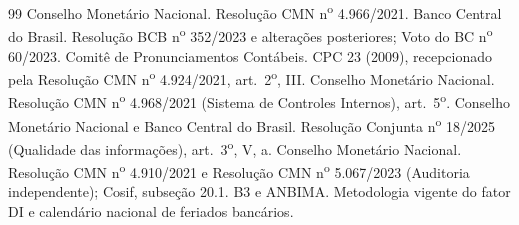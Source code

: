 \documentclass[11pt, a4paper]{article}
\theoremstyle{definition}
\theoremstyle{plain}
\theoremstyle{remark}
\begin{document}
\begin{thebibliography}{99}
 Conselho Monetário Nacional. Resolução CMN n\textsuperscript{o} 4.966/2021. Banco Central do Brasil. Resolução BCB n\textsuperscript{o} 352/2023 e alterações posteriores; Voto do BC n\textsuperscript{o} 60/2023.
 Comitê de Pronunciamentos Contábeis. CPC 23 (2009), recepcionado pela Resolução CMN n\textsuperscript{o} 4.924/2021, art.\ 2\textsuperscript{o}, III.
 Conselho Monetário Nacional. Resolução CMN n\textsuperscript{o} 4.968/2021 (Sistema de Controles Internos), art.\ 5\textsuperscript{o}.
 Conselho Monetário Nacional e Banco Central do Brasil. Resolução Conjunta n\textsuperscript{o} 18/2025 (Qualidade das informações), art.\ 3\textsuperscript{o}, V, a.
 Conselho Monetário Nacional. Resolução CMN n\textsuperscript{o} 4.910/2021 e Resolução CMN n\textsuperscript{o} 5.067/2023 (Auditoria independente); Cosif, subseção 20.1.
 B3 e ANBIMA. Metodologia vigente do fator DI e calendário nacional de feriados bancários.
\end{thebibliography}
\end{document}
